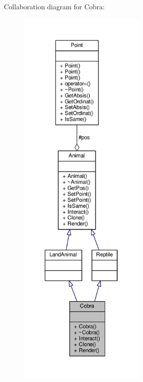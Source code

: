 Collaboration diagram for Cobra\+:
\nopagebreak
\begin{figure}[H]
\begin{center}
\leavevmode
\includegraphics[height=550pt]{classCobra__coll__graph}
\end{center}
\end{figure}
